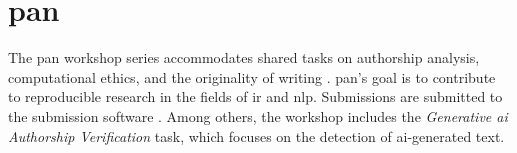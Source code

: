 \section{\acs{pan}}
\label{sec:pan}

The \ac{pan} workshop series accommodates shared tasks %
on authorship analysis, computational ethics, and the originality of writing \cite{ayele_overview_2024}.
\ac{pan}'s goal is to contribute to reproducible research in the fields of \ac{ir} and \ac{nlp}.
Submissions are submitted to the submission software \tira{}.
Among others, the workshop includes the \textit{Generative \ac{ai} Authorship Verification} task, which focuses on the detection of \ac{ai}-generated text.

